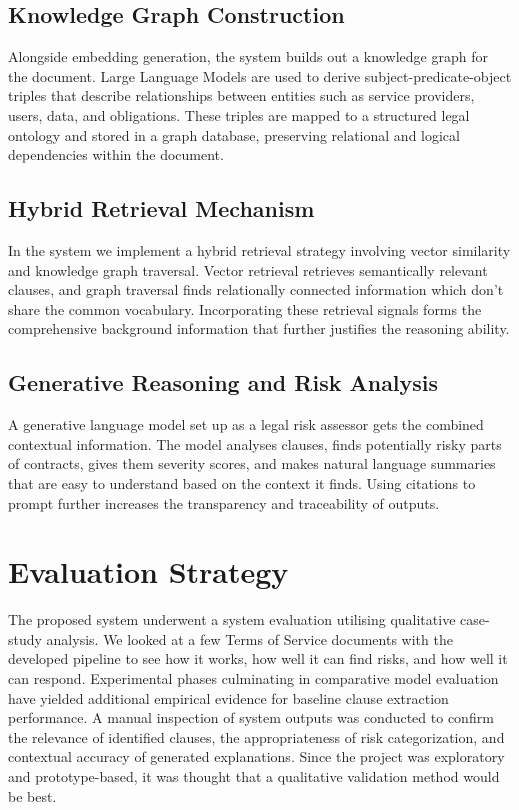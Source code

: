 \subsection{Knowledge Graph Construction}
Alongside embedding generation, the system builds out a knowledge
graph for the document. Large Language Models are used to derive
subject-predicate-object triples that describe relationships between
entities such as service providers, users, data, and obligations.
These triples are mapped to a structured legal ontology and stored in
a graph database, preserving relational and logical dependencies
within the document.

\subsection{Hybrid Retrieval Mechanism}
In the system we implement a hybrid retrieval strategy involving
vector similarity and knowledge graph traversal. Vector retrieval
retrieves semantically relevant clauses, and graph traversal finds
relationally connected information which don't share the common
vocabulary. Incorporating these retrieval signals forms the
comprehensive background information that further justifies the
reasoning ability.

\subsection{Generative Reasoning and Risk Analysis}
A generative language model set up as a legal risk assessor gets the
combined contextual information. The model analyses clauses, finds
potentially risky parts of contracts, gives them severity scores, and
makes natural language summaries that are easy to understand based on
the context it finds. Using citations to prompt further increases the
transparency and traceability of outputs.

\section{Evaluation Strategy}
The proposed system underwent a system evaluation utilising
qualitative case-study analysis. We looked at a few Terms of Service
documents with the developed pipeline to see how it works, how well
it can find risks, and how well it can respond. Experimental phases
culminating in comparative model evaluation have yielded additional
empirical evidence for baseline clause extraction performance. A
manual inspection of system outputs was conducted to confirm the
relevance of identified clauses, the appropriateness of risk
categorization, and contextual accuracy of generated explanations.
Since the project was exploratory and prototype-based, it was thought
that a qualitative validation method would be best.


